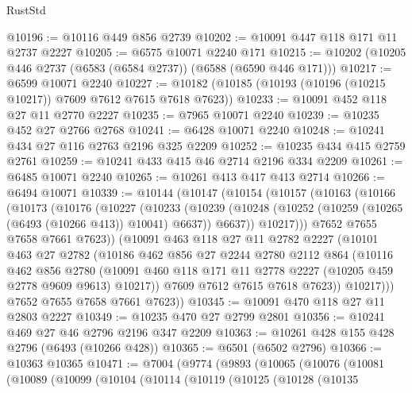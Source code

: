 \begin{lexlean}{RustStd}
\begin{coremodule}
@10196 := @10116 @449 @856 @2739
@10202 := @10091 @447 @118 @171 @11 @2737 @2227
@10205 := @6575 @10071 @2240 @171
@10215 := @10202 (@10205 @446 @2737 (@6583 (@6584 @2737)) (@6588 (@6590 @446 @171)))
@10217 := @6599 @10071 @2240
@10227 := @10182 (@10185 (@10193 (@10196 (@10215 @10217)) @7609 @7612 @7615 @7618 @7623))
@10233 := @10091 @452 @118 @27 @11 @2770 @2227
@10235 := @7965 @10071 @2240
@10239 := @10235 @452 @27 @2766 @2768
@10241 := @6428 @10071 @2240
@10248 := @10241 @434 @27 @116 @2763 @2196 @325 @2209
@10252 := @10235 @434 @415 @2759 @2761
@10259 := @10241 @433 @415 @46 @2714 @2196 @334 @2209
@10261 := @6485 @10071 @2240
@10265 := @10261 @413 @417 @413 @2714
@10266 := @6494 @10071
@10339 := @10144
    (@10147
      (@10154
        (@10157
          (@10163
            (@10166
              (@10173
                (@10176
                  (@10227
                    (@10233
                      (@10239
                        (@10248
                          (@10252 (@10259 (@10265 (@6493 (@10266 @413)) @10041) @6637))
                          @6637))
                      @10217)))
                @7652
                @7655
                @7658
                @7661
                @7623))
            (@10091
              @463
              @118
              @27
              @11
              @2782
              @2227
              (@10101
                @463
                @27
                @2782
                (@10186
                  @462
                  @856
                  @27
                  @2244
                  @2780
                  @2112
                  @864
                  (@10116
                    @462
                    @856
                    @2780
                    (@10091 @460 @118 @171 @11 @2778 @2227 (@10205 @459 @2778 @9609 @9613) @10217))
                  @7609
                  @7612
                  @7615
                  @7618
                  @7623))
              @10217)))
        @7652
        @7655
        @7658
        @7661
        @7623))
@10345 := @10091 @470 @118 @27 @11 @2803 @2227
@10349 := @10235 @470 @27 @2799 @2801
@10356 := @10241 @469 @27 @46 @2796 @2196 @347 @2209
@10363 := @10261 @428 @155 @428 @2796 (@6493 (@10266 @428))
@10365 := @6501 (@6502 @2796)
@10366 := @10363 @10365
@10471 := @7004
    (@9774
      (@9893
        (@10065
          (@10076
            (@10081
              (@10089
                (@10099
                  (@10104
                    (@10114
                      (@10119
                        (@10125
                          (@10128
                            (@10135

\end{coremodule}
\end{lexlean}
